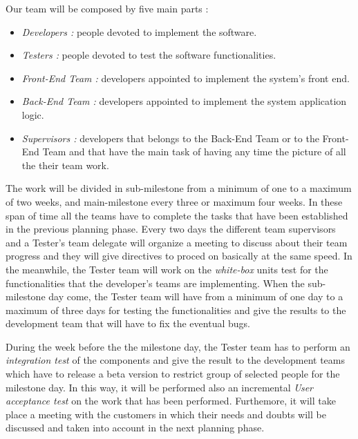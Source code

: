 \newpage
{}
Our team will be composed by five main parts :
\begin{itemize}
	\item \emph{Developers :} people devoted to implement the software.
	
	\item \emph{Testers :} people devoted to test the software functionalities.
	
	\item \emph{Front-End Team :} developers appointed to implement the system’s front end.
	
	
	\item \emph{Back-End Team :} developers appointed to implement the system application logic.
	
	\item \emph{Supervisors :} developers that belongs to the Back-End Team or to the Front-End Team and that have the main task of having any time the picture of all the their team work.
\end{itemize}

The work will be divided in sub-milestone from a minimum of one to a maximum of two weeks, and main-milestone every three or maximum four weeks. In these span of time all the teams have to complete the tasks that have been established in the previous planning phase. Every two days the different team supervisors and a Tester’s team delegate will organize a meeting to discuss about their team progress and they will give directives to proced on basically at the same speed. 
In the meanwhile, the Tester team will work on the \emph{white-box} units test for the functionalities that the developer’s teams are implementing.
When the sub-milestone day come, the Tester team will have from a minimum of one day to a maximum of three days for testing the functionalities and give the results to the development team that will have to fix the eventual bugs.

During the week before the the milestone day, the Tester team has to perform an \emph{integration test} of the components and give the result to the development teams which have to release a beta version to restrict group of selected people for the milestone day. In this way, it will be performed also an incremental \emph{User acceptance test} on the work that has been performed. Furthemore, it will take place a meeting with the customers in which their needs and doubts will be discussed and taken into account in the next planning phase.

